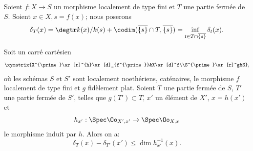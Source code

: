 \subsection{} \label{XIV.2.2} Soient $f:X\to S$ un morphisme localement de type fini et $T$ une partie ferm\'ee de $S$. Soient $x\in X, s=f(x)$; nous poserons
$$
\delta_T(x)=\degtr k(x)/k(s)+\codim(\overline{\{s\}}\cap T, \overline{\{s\}})=\inf_{t\in T\cap\overline{\{s\}}}\delta_t(x).
$$

\begin{sublemme} \label{XIV.2.2.1}
Soit un carr\'e cart\'esien
$$
\xymatrix{X^{\prime}\ar[r]^{h}\ar[d]_{f^{\prime}}&X\ar[d]^f\\S^{\prime}\ar[r]^g&S},
$$
o\`u les sch\'emas $S$ et $S'$ sont localement noeth\'eriens, cat\'enaires, le morphisme $f$ localement de type fini et $g$ fid\`element plat. Soient $T$ une partie ferm\'ee de $S$, $T'$ une partie ferm\'ee de $S'$, telles que $g(T')\subset T$, $x'$ un \'el\'ement de $X'$, $x=h(x')$ et
$$h_{x'}:\Spec\Oo_{X', x'}\to\Spec\Oo_{X, x}$$
le morphisme induit par $h$. Alors on a:
$$
\delta_T(x)-\delta_{T'}(x')\leq\dim h_{x'}^{-1}(x).
$$
\end{sublemme}

